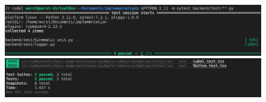 \begin{figure}[h!]
    \includegraphics[width=0.8\linewidth]{images/pytest-result.png}
    \includegraphics[width=0.8\linewidth]{images/jest-result.png}
\end{figure}

